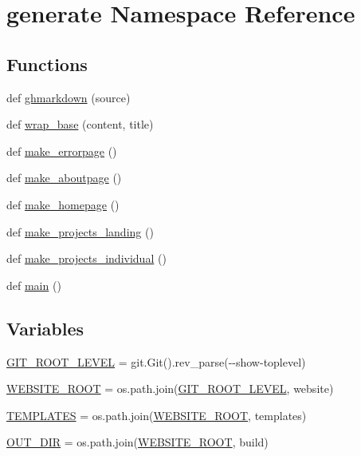 \hypertarget{namespacegenerate}{}\section{generate Namespace Reference}
\label{namespacegenerate}
\subsection*{Functions}
\begin{DoxyCompactItemize}
\item 
def \hyperlink{namespacegenerate_a7811fd26fa2e3aeec0e3d3851cdda546}{ghmarkdown} (source)
\item 
def \hyperlink{namespacegenerate_adb990cdb948e21150b35af85d236b6be}{wrap\+\_\+base} (content, title)
\item 
def \hyperlink{namespacegenerate_a1c52bc54613c3a13c908bc65d7911b8e}{make\+\_\+errorpage} ()
\item 
def \hyperlink{namespacegenerate_afa732feea0def89a5b9d1a2a6549ee60}{make\+\_\+aboutpage} ()
\item 
def \hyperlink{namespacegenerate_acffbc7c203626a1f396da4a96a2d448d}{make\+\_\+homepage} ()
\item 
def \hyperlink{namespacegenerate_a33f954414406a12534e313700841053e}{make\+\_\+projects\+\_\+landing} ()
\item 
def \hyperlink{namespacegenerate_a7e834fd25099e451f5809b35df4ef10d}{make\+\_\+projects\+\_\+individual} ()
\item 
def \hyperlink{namespacegenerate_a7f0253880883fcd9badd715587a15668}{main} ()
\end{DoxyCompactItemize}
\subsection*{Variables}
\begin{DoxyCompactItemize}
\item 
\hyperlink{namespacegenerate_afea39d363835652697e0616074816686}{G\+I\+T\+\_\+\+R\+O\+O\+T\+\_\+\+L\+E\+V\+EL} = git.\+Git().rev\+\_\+parse(\textquotesingle{}-\/-\/show-\/toplevel\textquotesingle{})
\item 
\hyperlink{namespacegenerate_a3cb5a2707122c53bf81da4c33e3f65c4}{W\+E\+B\+S\+I\+T\+E\+\_\+\+R\+O\+OT} = os.\+path.\+join(\hyperlink{namespacegenerate_afea39d363835652697e0616074816686}{G\+I\+T\+\_\+\+R\+O\+O\+T\+\_\+\+L\+E\+V\+EL}, \textquotesingle{}website\textquotesingle{})
\item 
\hyperlink{namespacegenerate_ae98641ac5f9b63366f1c9b644d0a7548}{T\+E\+M\+P\+L\+A\+T\+ES} = os.\+path.\+join(\hyperlink{namespacegenerate_a3cb5a2707122c53bf81da4c33e3f65c4}{W\+E\+B\+S\+I\+T\+E\+\_\+\+R\+O\+OT}, \textquotesingle{}templates\textquotesingle{})
\item 
\hyperlink{namespacegenerate_a6883b4bdece5baaaaf8a166563dd789e}{O\+U\+T\+\_\+\+D\+IR} = os.\+path.\+join(\hyperlink{namespacegenerate_a3cb5a2707122c53bf81da4c33e3f65c4}{W\+E\+B\+S\+I\+T\+E\+\_\+\+R\+O\+OT}, \textquotesingle{}build\textquotesingle{})
\end{DoxyCompactItemize}


